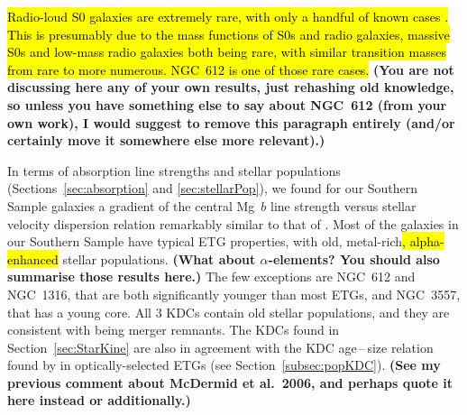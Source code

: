 \documentclass[a4paper,fleqn,usenatbib]{mnras}
\DeclareRobustCommand{\removed}[1]{{\sethlcolor{red}\hl{#1}}}
\DeclareRobustCommand{\added}[1]{{\sethlcolor{green}\hl{#1}}}
\begin{document}
\removed{Radio-loud S0 galaxies are extremely rare, with only a handful of
known cases \citep[e.g.][]{Heckman1982, Morganti2011}. This is
presumably due to the mass functions of S0s and radio galaxies,
massive S0s and low-mass radio galaxies both being rare, with similar
transition masses from rare to more numerous. NGC~612 is one of those
rare cases.} {\bf (You are not discussing here any of your own results,
  just rehashing old knowledge, so unless you have something else to
  say about NGC~612 (from your own work), I would suggest to remove
  this paragraph entirely (and/or certainly move it somewhere else
  more relevant).)}

In terms of absorption line strengths and stellar populations
(Sections~\ref{sec:absorption} and \ref{sec:stellarPop}), we found for
our Southern Sample galaxies a gradient of the central Mg~$b$ line
strength versus stellar velocity dispersion relation remarkably
similar to that of \citet{Ziegler1997}. Most of the galaxies in our
Southern Sample have typical ETG properties, with old, metal-rich\added{, alpha-enhanced}
stellar populations. {\bf (What about $\alpha$-elements? You should
  also summarise those results here.)} The few exceptions are NGC~612
and NGC~1316, that are both significantly younger than most ETGs, and
NGC~3557, that has a young core. All $3$ KDCs contain old stellar
populations, and they are consistent with being merger remnants. The
KDCs found in Section~\ref{sec:StarKine} are also in agreement with
the KDC age\,--\,size relation found by \added{\citet{McDermid2006}} 
\removed{\citet{Kuntschner2010}} in optically-selected ETGs (see 
Section~\ref{subsec:popKDC}). {\bf (See my previous comment about 
McDermid et al.\ 2006, and perhaps quote it here instead or 
additionally.)}
\end{document}
